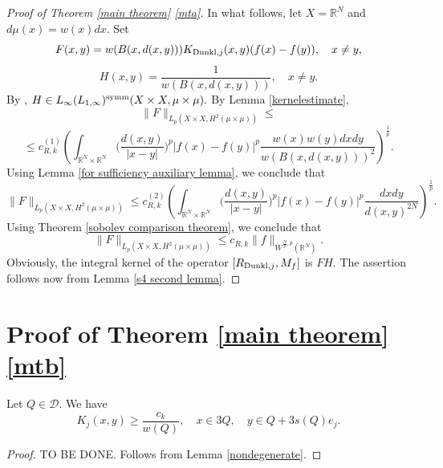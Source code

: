 \documentclass{amsart}
\numberwithin{equation}{section}
\begin{document}
\begin{proof}[Proof of Theorem \ref{main theorem} \eqref{mta}]
In what follows, let $X=\mathbb{R}^N$ and $d\mu(x)=w(x)dx.$ Set
$$F(x,y)=w(B(x,d(x,y)))K_{{\rm Dunkl},j}(x,y)(f(x)-f(y)),\quad x\neq y,$$
$$H(x,y)=\frac1{w(B(x,d(x,y)))},\quad x\neq y.$$
By \cite[Lemma 11.7]{HKarxiv}, $H\in L_{\infty}(L_{1,\infty})^{\rm symm}(X\times X,\mu\times\mu).$ By Lemma \ref{kernelestimate},
$$\|F\|_{L_p(X\times X,H^2(\mu\times\mu))}\leq$$
$$\leq c_{R,k}^{(1)}\left(\int_{\mathbb{R}^N\times\mathbb{R}^N}\Big(\frac{d(x,y)}{|x-y|}\Big)^p|f(x)-f(y)|^p\frac{w(x)w(y)dxdy}{w(B(x,d(x,y)))^2}\right)^{\frac1p}.$$
Using Lemma \ref{for sufficiency auxiliary lemma}, we conclude that
$$\|F\|_{L_p(X\times X,H^2(\mu\times\mu))}\leq c_{R,k}^{(2)}\left(\int_{\mathbb{R}^N\times\mathbb{R}^N}\Big(\frac{d(x,y)}{|x-y|}\Big)^p|f(x)-f(y)|^p \frac{dxdy}{d(x,y)^{2N}}\right)^{\frac1p}.$$
Using Theorem \ref{sobolev comparison theorem}, we conclude that
$$\|F\|_{L_p(X\times X,H^2(\mu\times\mu))}\leq c_{R,k}\|f\|_{\dot{W}^{\frac{N}{p},p}(\mathbb{R}^N)}.$$
Obviously, the integral kernel of the operator $[R_{{\rm Dunkl},j},M_f]$ is $FH.$ The assertion follows now from Lemma \ref{s4 second lemma}.
\end{proof}


\section{Proof of Theorem \ref{main theorem} \eqref{mtb}}\label{lower estimate section}


\begin{lemma}\label{nondegenerate corollary} Let $Q\in\mathcal{D}.$ We have
$$K_j(x,y)\geq \frac{c_k}{w(Q)},\quad x\in 3Q,\quad y\in Q+3s(Q)e_j.$$
\end{lemma}
\begin{proof} {\color{red} TO BE DONE. Follows from Lemma \ref{nondegenerate}.}
\end{proof}
\end{document}
